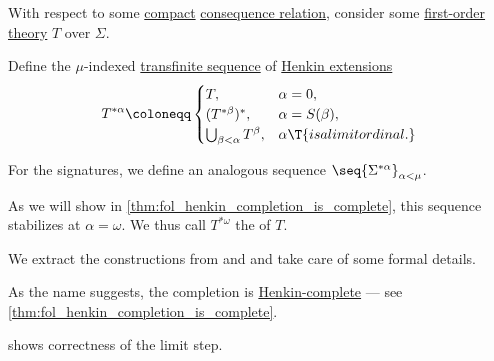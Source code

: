 \begin{definition}\label{def:fol_henkin_completion}\mimprovised
  With respect to some \hyperref[def:consequence_relation/compactness]{compact} \hyperref[def:consequence_relation]{consequence relation}, consider some \hyperref[def:fol_theory]{first-order theory} \( T \) over \( \Sigma \).

  Define the \( \mu \)-indexed \hyperref[def:transfinite_sequence]{transfinite sequence} of \hyperref[def:fol_henkin_extension]{Henkin extensions}
  \begin{equation*}
    T^{*\alpha} \coloneqq \begin{cases}
      T,                                &\alpha = 0, \\
      (T^{*\beta})^*,                   &\alpha = S(\beta), \\
      \bigcup_{\beta < \alpha} T^\beta, &\alpha \T{is a limit ordinal.}
    \end{cases}
  \end{equation*}

  For the signatures, we define an analogous sequence \( \seq{ \Sigma^{*\alpha} }_{\alpha < \mu} \).

  As we will show in \cref{thm:fol_henkin_completion_is_complete}, this sequence stabilizes at \( \alpha = \omega \). We thus call \( T^{*\omega} \) the  of \( T \).
\end{definition}
\begin{comments}
  \item We extract the constructions from \cite[lemma 3.1.8]{VanDalen2004LogicAndStructure} and \cite[47]{Shoenfield1967MathematicalLogic} and take care of some formal details.

  \item As the name suggests, the completion is \hyperref[def:fol_henkin_completeness]{Henkin-complete} --- see \cref{thm:fol_henkin_completion_is_complete}.
\end{comments}
\begin{defproof}
   shows correctness of the limit step.
\end{defproof}


